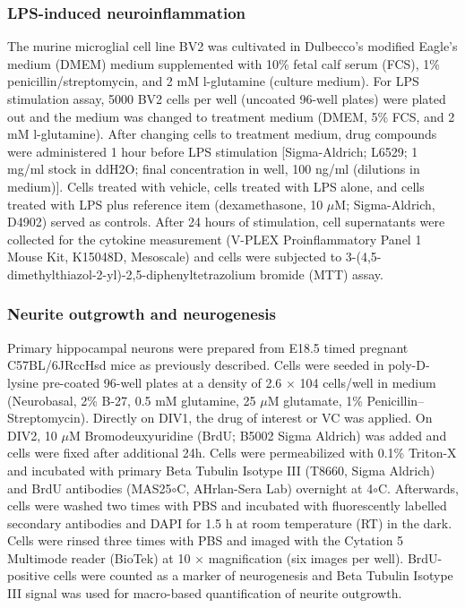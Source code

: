 \documentclass[letterpaper]{article}
\begin{document}
\subsubsection{LPS-induced neuroinflammation}

The murine microglial cell line BV2 was cultivated in Dulbecco’s modified
Eagle's medium (DMEM) medium supplemented with 10\% fetal calf serum (FCS),
1\% penicillin/streptomycin, and 2 mM l-glutamine (culture medium). For LPS
stimulation assay, 5000 BV2 cells per well (uncoated 96-well plates) were
plated out and the medium was changed to treatment medium (DMEM, 5\% FCS, and
2 mM l-glutamine). After changing cells to treatment medium, drug compounds
were administered 1 hour before LPS stimulation [Sigma-Aldrich; L6529; 1 mg/ml
stock in ddH2O; final concentration in well, 100 ng/ml (dilutions in medium)].
Cells treated with vehicle, cells treated with LPS alone, and cells treated
with LPS plus reference item (dexamethasone, 10 $\mu$M; Sigma-Aldrich, D4902)
served as controls. After 24 hours of stimulation, cell supernatants were
collected for the cytokine measurement (V-PLEX Proinflammatory Panel 1 Mouse
Kit, K15048D, Mesoscale) and cells were subjected to
3-(4,5-dimethylthiazol-2-yl)-2,5-diphenyltetrazolium bromide (MTT) assay.

\subsubsection{Neurite outgrowth and neurogenesis}

Primary hippocampal neurons were prepared from E18.5 timed pregnant
C57BL/6JRccHsd mice as previously described. Cells were seeded in
poly-D-lysine pre-coated 96-well plates at a density of 2.6 $\times$ 104
cells/well in medium (Neurobasal,
2\% B-27, 0.5 mM glutamine, 25 $\mu$M glutamate,
1\% Penicillin–Streptomycin). Directly on DIV1, the drug of interest or VC was
applied. On DIV2, 10 $\mu$M Bromodeuxyuridine (BrdU; B5002 Sigma Aldrich) was
added and cells were fixed after additional 24h. Cells were permeabilized with
0.1\% Triton-X and incubated with primary Beta Tubulin Isotype III (T8660,
Sigma Aldrich) and BrdU antibodies (MAS25$\circ$C, AHrlan-Sera Lab) overnight
at 4$\circ$C. Afterwards, cells were washed two times with PBS and incubated
with fluorescently labelled secondary antibodies and DAPI for 1.5 h at room
temperature (RT) in the dark. Cells were rinsed three times with PBS and
imaged with the Cytation 5 Multimode reader (BioTek) at 10 $\times$
magnification (six images per well). BrdU-positive cells were counted as a
marker of neurogenesis and Beta Tubulin Isotype III signal was used for
macro-based quantification of neurite outgrowth.
\end{document}
